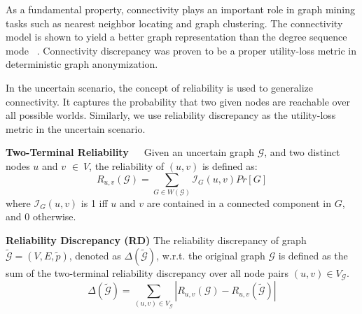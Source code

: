 As a fundamental property, connectivity plays an important role in graph mining tasks such as nearest neighbor locating and graph clustering. The connectivity model is shown to yield a better graph representation than the degree sequence mode ~\cite{Liu_Privacy_2009}.  Connectivity discrepancy was proven to be a proper utility-loss metric in deterministic graph anonymization. 

In the uncertain scenario, the concept of reliability is used to generalize connectivity. It captures the probability that two given nodes are reachable over all possible worlds. Similarly, we  use reliability discrepancy as the utility-loss metric in the uncertain scenario. 

\begin{definition}
    \textbf{Two-Terminal Reliability~\cite{Colbourn_Colbourn_1987}}~~Given an uncertain graph $\mathcal{G}$, and two distinct nodes $u$ and $v$  $\in~V$, the reliability of $(u,v)$ is defined as:
        \begin{equation*}
                R_{u,v}(\mathcal{G})= \sum_{G \in W(\mathcal{G})}  \mathcal{I}_{G}(u,v) Pr[G] 
        \end{equation*}
    where $\mathcal{I}_{G}(u,v)$ is 1 iff $u$ and $v$ are contained in a connected component in $G$, and 0 otherwise.   
    \label{d:reliability}
\end{definition}



\theoremstyle{definition}
\begin{definition}
    \textbf{Reliability Discrepancy (RD)}
    The reliability discrepancy of graph $\tilde{\mathcal{G}}=(V,E, \tilde{\mathit{p}})$, 
    denoted as $\Delta(\tilde{\mathcal{G}})$, 
    w.r.t. the original graph  $\mathcal{G}$ is 
    defined as the sum of the two-terminal reliability discrepancy over all node pairs $(u,v) \in V_\mathcal{G}$.
    \begin{equation*}
        \Delta(\tilde{\mathcal{G}})=\sum_{(u,v) \in V_\mathcal{G} }|R_{u,v}(\mathcal{G})-R_{u,v}(\tilde{\mathcal{G}})|
    \end{equation*}
\end{definition}

